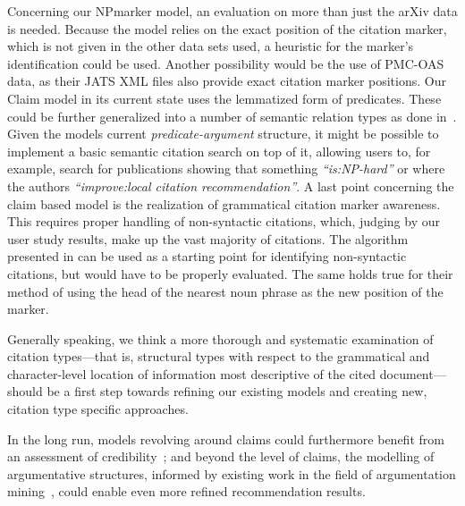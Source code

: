 Concerning our NPmarker model, an evaluation on more than just the arXiv data is needed. Because the model relies on the exact position of the citation marker, which is not given in the other data sets used, a heuristic for the marker's identification could be used. Another possibility would be the use of PMC-OAS data, as their JATS XML files also provide exact citation marker positions. Our Claim model in its current state uses the lemmatized form of predicates. These could be further generalized into a number of semantic relation types as done in~\cite{Gabor2018}. Given the models current \emph{predicate-argument} structure, it might be possible to implement a basic semantic citation search on top of it, allowing users to, for example, search for publications showing that something \emph{``is:NP-hard''} or where the authors \emph{``improve:local citation recommendation''}. A last point concerning the claim based model is the realization of grammatical citation marker awareness. This requires proper handling of non-syntactic citations, which, judging by our user study results, make up the vast majority of citations. The algorithm presented in \cite{Abujbara2012} can be used as a starting point for identifying non-syntactic citations, but would have to be properly evaluated. The same holds true for their method of using the head of the nearest noun phrase as the new position of the marker.

Generally speaking, we think a more thorough and systematic examination of citation types---that is, structural types with respect to the grammatical and character-level location of information most descriptive of the cited document---should be a first step towards refining our existing models and creating new, citation type specific approaches.

In the long run, models revolving around claims could furthermore benefit from an assessment of credibility~\cite{Popat2016}; and beyond the level of claims, the modelling of argumentative structures, informed by existing work in the field of argumentation mining~\cite{Stab2016,Lippi2016,Habernal2017}, could enable even more refined recommendation results.
